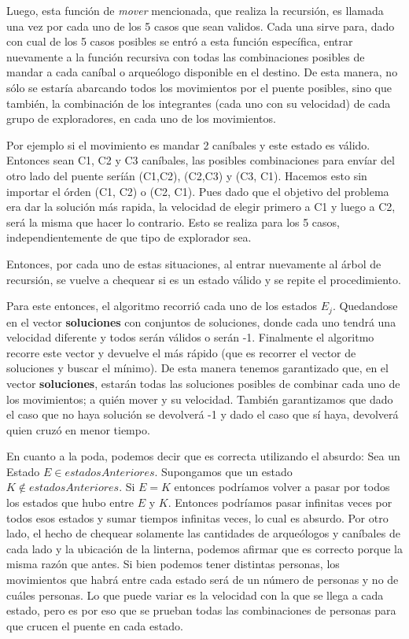        Luego, esta función de \emph{mover} mencionada, que realiza la recursión, es llamada una vez por cada uno de los 5 casos que sean validos. Cada una sirve para, dado con cual de los 5 casos posibles se entró a esta función específica, entrar nuevamente a la función recursiva con todas las combinaciones posibles de mandar a cada caníbal o arqueólogo disponible en el destino. De esta manera, no sólo se estaría abarcando todos los movimientos por el puente posibles, sino que también, la combinación de los integrantes (cada uno con su velocidad) de cada grupo de exploradores, en cada uno de los movimientos.

       Por ejemplo si el movimiento es mandar 2 caníbales y este estado es válido. Entonces sean C1, C2 y C3 caníbales, las posibles combinaciones para envíar del otro lado del puente seríán (C1,C2), (C2,C3) y (C3, C1). Hacemos esto sin importar el órden (C1, C2) o (C2, C1). Pues dado que el objetivo del problema era dar la solución más rapida, la velocidad de elegir primero a C1 y luego a C2, será la misma que hacer lo contrario. Esto se realiza para los 5 casos, independientemente de que tipo de explorador sea.

       Entonces, por cada uno de estas situaciones, al entrar nuevamente al árbol de recursión, se vuelve a chequear si es un estado válido y se repite el procedimiento. 

       Para este entonces, el algoritmo recorrió cada uno de los estados $E_{j}$. Quedandose en el vector \textbf{soluciones} con conjuntos de soluciones, donde cada uno tendrá una velocidad diferente y todos serán válidos o serán -1. Finalmente el algoritmo recorre este vector y devuelve el más rápido (que es recorrer el vector de soluciones y buscar el mínimo). De esta manera tenemos garantizado que, en el vector \textbf{soluciones}, estarán todas las soluciones posibles de combinar cada uno de los movimientos; a quién mover y su velocidad. También garantizamos que dado el caso que no haya solución se devolverá -1 y dado el caso que sí haya, devolverá quien cruzó en menor tiempo.

       En cuanto a la poda, podemos decir que es correcta utilizando el absurdo:
       Sea un Estado $E \in estadosAnteriores$. Supongamos que un estado $K \not \in estadosAnteriores$. Si $E = K$ entonces podríamos volver a pasar por todos los estados que hubo entre $E$ y $K$. Entonces podríamos pasar infinitas veces por todos esos estados y sumar tiempos infinitas veces, lo cual es absurdo.
       Por otro lado, el hecho de chequear solamente las cantidades de arqueólogos y caníbales de cada lado y la ubicación de la linterna, podemos afirmar que es correcto porque la misma razón que antes. Si bien podemos tener distintas personas, los movimientos que habrá entre cada estado será de un número de personas y no de cuáles personas. Lo que puede variar es la velocidad con la que se llega a cada estado, pero es por eso que se prueban todas las combinaciones de personas para que crucen el puente en cada estado.



